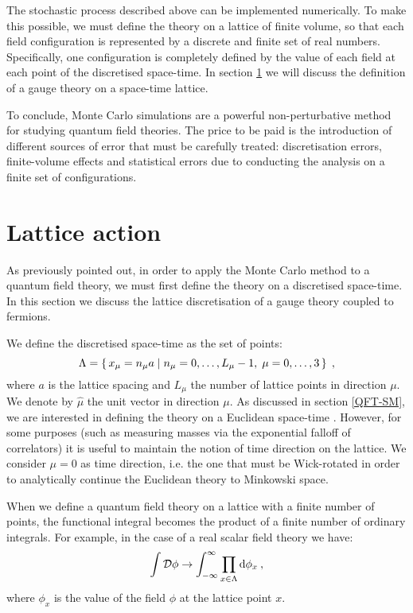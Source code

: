 The stochastic process described above can be implemented numerically. To make this possible, we must define the theory on a lattice of finite volume, so that each field configuration is represented by a discrete and finite set of real numbers. Specifically, one configuration is completely defined by the value of each field at each point of the discretised space-time.  In section \ref{Lattice_action} we will discuss the definition of a gauge theory on a space-time lattice.

To conclude, Monte Carlo simulations are a powerful non-perturbative method for studying quantum field theories. The price to be paid is the introduction of different sources of error that must be carefully treated: discretisation errors, finite-volume effects and statistical errors due to conducting the analysis on a finite set of configurations. 





\section{Lattice action}
\label{Lattice_action}

As previously pointed out, in order to apply the Monte Carlo method to a quantum field theory, we must first define the theory on a discretised space-time. In this section we discuss the lattice discretisation of a gauge theory coupled to fermions.

We define the discretised space-time as the set of points:
\begin{equation}
\Lambda = \set{x_{\mu} = n_{\mu} a  \mid  n_{\mu} = 0, \dots, L_{\mu} -1, \; \mu = 0, \dots, 3 } \; ,
\end{equation}
%
where $a$ is the lattice spacing and $L_{ \mu}$ the number of lattice points in direction $\mu$. We denote by $\hat \mu$ the unit vector in direction $\mu$. As discussed in section \ref{QFT-SM}, we are interested in defining the theory on a Euclidean space-time . However, for some purposes (such as measuring masses via the exponential falloff of correlators) it is useful to maintain the notion of time direction on the lattice. We consider $\mu = 0$ as time direction, i.e. the one that must be Wick-rotated in order to analytically continue the Euclidean theory to Minkowski space.

When we define a quantum field theory on a lattice with a finite number of points, the functional integral becomes the product of a finite number of ordinary integrals. For example, in the case of a real scalar field theory we have:
\begin{equation}
\int \mathcal D \phi \to \int_{-\infty}^{\infty} \prod_{x \in \Lambda} \mathrm{d} \phi_x \: ,
\end{equation}
%
where $\phi_x$ is the value of the field $\phi$ at the lattice point $x$.

